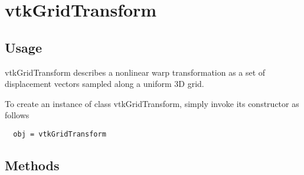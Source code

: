 \section{vtkGridTransform}

\subsection{Usage}

 vtkGridTransform describes a nonlinear warp transformation as a set
 of displacement vectors sampled along a uniform 3D grid.

To create an instance of class vtkGridTransform, simply
invoke its constructor as follows
\begin{verbatim}
  obj = vtkGridTransform
\end{verbatim}
\subsection{Methods}

